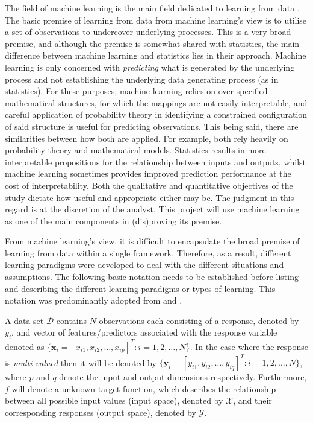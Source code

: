 The field of machine learning is the main field dedicated to learning from data \citep{abu2012learning}. The basic premise of learning from data from machine learning's view is to utilise a set of observations to undercover underlying processes. This is a very broad premise, and although the premise is somewhat shared with statistics, the main difference  between machine learning and statistics lies in their approach. Machine learning is only concerned with \textit{predicting} what is generated by the underlying process and not establishing the underlying data generating process (as in statistics). For these purposes, machine learning relies on over-specified mathematical structures, for which the mappings are not easily interpretable, and careful application of probability theory in identifying a constrained configuration of said structure is useful for predicting observations. This being said, there are similarities between how both are applied. For example, both rely heavily on probability theory and mathematical models. Statistics results in more interpretable propositions for the relationship between inputs and outputs, whilst machine learning sometimes provides improved prediction performance at the cost of interpretability. Both the qualitative and quantitative objectives of the study dictate how useful and appropriate either may be. The judgment in this regard is at the discretion of the analyst. This project will use machine learning as one of the main components in (dis)proving its premise. 

From machine learning's view, it is difficult to encapsulate the broad premise of learning from data within a single framework. Therefore, as a result, different learning paradigms were developed to deal with the different situations and assumptions. The following basic notation needs to be established before listing and describing the different learning paradigms or types of learning. This notation was predominantly adopted from \citet{abu2012learning} and \citet*{et2020pien}.
 
A data set $\mathcal{D}$ contains $N$ observations each consisting of a response, denoted by $y_i$, and vector of features/predictors associated with the response variable denoted as $\{\boldsymbol{x}_i = [x_{i1},x_{i2},\ldots, x_{ip}]^T :i = 1,2,\ldots,N$\}. In the case where the response is \textit{multi-valued} then it will be denoted by $\{\boldsymbol{y}_i = [y_{i1},y_{i2},\ldots, y_{iq}]^T :i = 1,2,\ldots,N\}$, where $p$ and $q$ denote the input and output dimensions respectively. Furthermore, $f$ will denote a unknown target function, which describes the relationship between all possible input values (input space), denoted by $\mathcal{X}$, and their corresponding responses (output space), denoted by $\mathcal{Y}$. 

